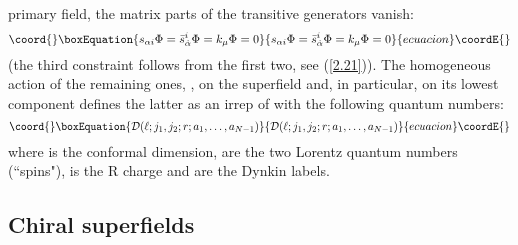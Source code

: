 \documentclass[a4paper,12pt]{article}
\begin{document}
primary field, the matrix parts of the transitive generators 
\coordHE{} vanish: 
\begin{equation}\coord{}\boxEquation{\label{6}
  s_{\alpha i}\Phi= \bar s_{\dot\alpha}^i\Phi=  k_\mu\Phi= 0
}{s_{\alpha i}\Phi= \bar s_{\dot\alpha}^i\Phi=  k_\mu\Phi= 0
}{ecuacion}\coordE{}\end{equation}
(the third constraint follows from the first two, see 
(\ref{2.21})). The homogeneous action of the remaining ones, 
\coordHE{}, on the superfield and, in particular, on its lowest 
component \coordHE{} defines the 
latter as an irrep of \coordHE{} with the following 
quantum numbers: 
\begin{equation}\coord{}\boxEquation{\label{7}
  {\cal D}(\ell;j_1,j_2;r;a_1,\ldots, a_{N-1})
}{{\cal D}(\ell;j_1,j_2;r;a_1,\ldots, a_{N-1})
}{ecuacion}\coordE{}\end{equation}
where \myHighlight{$\ell$}\coordHE{} is the conformal dimension, \coordHE{} are the two 
Lorentz quantum numbers (``spins"), \coordHE{} is the R charge and 
\coordHE{} are the \coordHE{} Dynkin labels.  
  
\subsection{Chiral superfields}\label{chsup}
\end{document}
